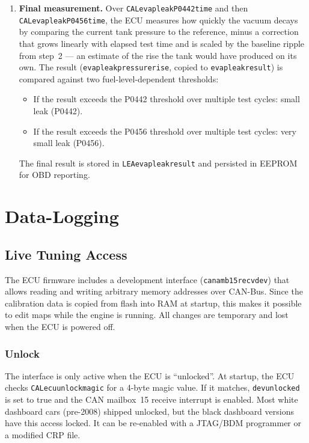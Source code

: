 \documentclass[a4paper,11pt]{article}
\renewcommand{\_}{\oldunderscore\allowbreak}
\begin{document}
\begin{enumerate}
      level.
\item \textbf{Final measurement.} Over
      \texttt{CAL\_evap\_leak\_P0442\_time} and then
      \texttt{CAL\_evap\_leak\_P0456\_time}, the ECU measures how quickly the
      vacuum decays by comparing the current tank pressure to the reference,
      minus a correction that grows linearly with elapsed test time and is
      scaled by the baseline ripple from step~2 --- an estimate of the rise
      the tank would have produced on its own. The result
      (\texttt{evap\_leak\_pressure\_rise}, copied to
      \texttt{evap\_leak\_result}) is compared against two fuel-level-dependent
      thresholds:
      \begin{itemize}
      \item If the result exceeds the P0442 threshold over multiple test
            cycles: small leak (P0442).
      \item If the result exceeds the P0456 threshold over multiple test
            cycles: very small leak (P0456).
      \end{itemize}
      The final result is stored in \texttt{LEA\_evap\_leak\_result} and
      persisted in EEPROM for OBD reporting.
\end{enumerate}

\section{Data-Logging}\label{sec:data-logging}

\subsection{Live Tuning Access}\label{sec:live-tuning}

The ECU firmware includes a development interface
(\texttt{can\_a\_mb15\_recv\_dev}) that allows reading and writing arbitrary
memory addresses over CAN-Bus. Since the calibration data is copied from flash
into RAM at startup, this makes it possible to edit maps while the engine is
running. All changes are temporary and lost when the ECU is powered off.

\subsubsection*{Unlock}

The interface is only active when the ECU is ``unlocked''. At startup, the ECU
checks \texttt{CAL\_ecu\_unlock\_magic} for a 4-byte magic value. If it
matches, \texttt{dev\_unlocked} is set to true and the CAN mailbox~15 receive
interrupt is enabled. Most white dashboard cars (pre-2008) shipped unlocked,
but the black dashboard versions have this access locked. It can be re-enabled
with a JTAG/BDM programmer or a modified CRP file.
\end{document}

